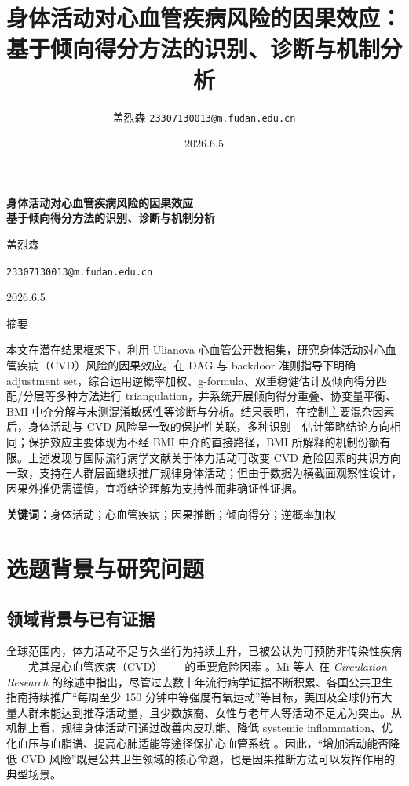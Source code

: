 \documentclass[12pt,a4paper]{article}
\title{身体活动对心血管疾病风险的因果效应：\\基于倾向得分方法的识别、诊断与机制分析}
\author{盖烈森 \texttt{23307130013@m.fudan.edu.cn}}
\date{2026.6.5}
\renewcommand{\abstractname}{摘要}
\renewenvironment{abstract}{%
  \centerline{\cfttoctitlefont\abstractname}\par\vspace{0.8em}%
  \list{}{%
    \setlength{\leftmargin}{0pt}%
    \setlength{\rightmargin}{0pt}}%
  \item\relax\fontsize{13pt}{15.6pt}\selectfont}
 {\endlist}
\begin{document}
\begin{titlepage}
\centering
\vspace*{2.8cm}
\begingroup
\linespread{1.25}\selectfont
{\LARGE\bfseries
身体活动对心血管疾病风险的因果效应\\[0.6em]
基于倾向得分方法的识别、诊断与机制分析
\par}
\endgroup
\vspace{2.8cm}
{\Large 盖烈森\par}
\vspace{0.8cm}
{\large \texttt{23307130013@m.fudan.edu.cn}\par}
\vspace{2.2cm}
{\Large 2026.6.5\par}
\vfill
\end{titlepage}

\newpage
\begin{abstract}
\noindent 本文在潜在结果框架下，利用 Ulianova 心血管公开数据集，研究身体活动对心血管疾病（CVD）风险的因果效应。在 DAG 与 backdoor 准则指导下明确 adjustment set，综合运用逆概率加权、g-formula、双重稳健估计及倾向得分匹配/分层等多种方法进行 triangulation，并系统开展倾向得分重叠、协变量平衡、BMI 中介分解与未测混淆敏感性等诊断与分析。结果表明，在控制主要混杂因素后，身体活动与 CVD 风险呈一致的保护性关联，多种识别—估计策略结论方向相同；保护效应主要体现为不经 BMI 中介的直接路径，BMI 所解释的机制份额有限。上述发现与国际流行病学文献关于体力活动可改变 CVD 危险因素的共识方向一致，支持在人群层面继续推广规律身体活动；但由于数据为横截面观察性设计，因果外推仍需谨慎，宜将结论理解为支持性而非确证性证据。

\vspace{0.6em}
\noindent\textbf{关键词：}身体活动；心血管疾病；因果推断；倾向得分；逆概率加权
\end{abstract}

\newpage
\tableofcontents

\newpage
\setcounter{page}{1}

\section{选题背景与研究问题}

\subsection{领域背景与已有证据}

全球范围内，体力活动不足与久坐行为持续上升，已被公认为可预防非传染性疾病——尤其是心血管疾病（CVD）——的重要危险因素 \cite{mi2025creview}。Mi 等人 \cite{mi2025creview} 在 \textit{Circulation Research} 的综述中指出，尽管过去数十年流行病学证据不断积累、各国公共卫生指南持续推广“每周至少 150 分钟中等强度有氧运动”等目标，美国及全球仍有大量人群未能达到推荐活动量，且少数族裔、女性与老年人等活动不足尤为突出。从机制上看，规律身体活动可通过改善内皮功能、降低 systemic inflammation、优化血压与血脂谱、提高心肺适能等途径保护心血管系统 \cite{mi2025creview}。因此，“增加活动能否降低 CVD 风险”既是公共卫生领域的核心命题，也是因果推断方法可以发挥作用的典型场景。
\end{document}

